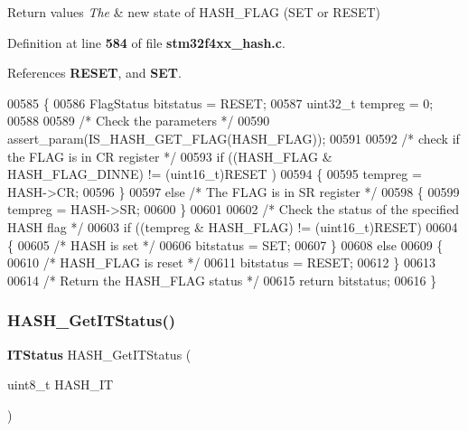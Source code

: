 \begin{DoxyRetVals}{Return values}
{\em The} & new state of H\+A\+S\+H\+\_\+\+F\+L\+AG (S\+ET or R\+E\+S\+ET) \\
\hline
\end{DoxyRetVals}


Definition at line \textbf{ 584} of file \textbf{ stm32f4xx\+\_\+hash.\+c}.



References \textbf{ R\+E\+S\+ET}, and \textbf{ S\+ET}.


\begin{DoxyCode}
00585 \{
00586   FlagStatus bitstatus = RESET;
00587   uint32\_t tempreg = 0;
00588 
00589   \textcolor{comment}{/* Check the parameters */}
00590   assert_param(IS_HASH_GET_FLAG(HASH\_FLAG));
00591 
00592   \textcolor{comment}{/* check if the FLAG is in CR register */}
00593   \textcolor{keywordflow}{if} ((HASH\_FLAG & HASH_FLAG_DINNE) != (uint16\_t)RESET ) 
00594   \{
00595     tempreg = HASH->CR;
00596   \}
00597   \textcolor{keywordflow}{else} \textcolor{comment}{/* The FLAG is in SR register */}
00598   \{
00599     tempreg = HASH->SR;
00600   \}
00601 
00602   \textcolor{comment}{/* Check the status of the specified HASH flag */}
00603   \textcolor{keywordflow}{if} ((tempreg & HASH\_FLAG) != (uint16\_t)RESET)
00604   \{
00605     \textcolor{comment}{/* HASH is set */}
00606     bitstatus = SET;
00607   \}
00608   \textcolor{keywordflow}{else}
00609   \{
00610     \textcolor{comment}{/* HASH\_FLAG is reset */}
00611     bitstatus = RESET;
00612   \}
00613 
00614   \textcolor{comment}{/* Return the HASH\_FLAG status */}
00615   \textcolor{keywordflow}{return}  bitstatus;
00616 \}
\end{DoxyCode}
\mbox{\label{group__HASH__Group5_ga49a9d1ad196112cd3614b8c428a4c4cf}} 
\subsubsection{H\+A\+S\+H\+\_\+\+Get\+I\+T\+Status()}
{\footnotesize\ttfamily \textbf{ I\+T\+Status} H\+A\+S\+H\+\_\+\+Get\+I\+T\+Status (\begin{DoxyParamCaption}\item[{uint8\+\_\+t}]{H\+A\+S\+H\+\_\+\+IT }\end{DoxyParamCaption})}



